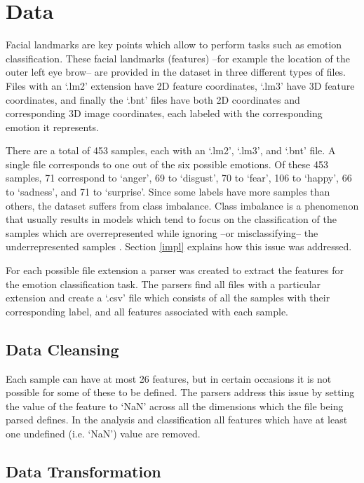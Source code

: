 \section{Data}

Facial landmarks are key points which allow to perform tasks such as emotion classification. These facial landmarks (features) --for example the location of the outer left eye brow-- are provided in the dataset in three different types of files. Files with an `.lm2' extension have 2D feature coordinates, `.lm3' have 3D feature coordinates, and finally the `.bnt' files have both 2D coordinates and corresponding 3D image coordinates, each labeled with the corresponding emotion it represents.

There are a total of 453 samples, each with an `.lm2', `.lm3', and `.bnt' file. A single file corresponds to one out of the six possible emotions. Of these 453 samples, 71 correspond to `anger', 69 to `disgust', 70 to `fear', 106 to `happy', 66 to `sadness', and 71 to `surprise'. Since some labels have more samples than others, the dataset suffers from class imbalance. Class imbalance is a phenomenon that usually results in models which tend to focus on the classification of the samples which are overrepresented while ignoring --or misclassifying-- the underrepresented samples \cite{data-mining-intro}. Section \ref{impl} explains how this issue was addressed.

For each possible file extension a parser was created to extract the features for the emotion classification task. The parsers find all files with a particular extension and create a `.csv' file which consists of all the samples with their corresponding label, and all features associated with each sample.

\subsection{Data Cleansing}

Each sample can have at most 26 features, but in certain occasions it is not possible for some of these to be defined. The parsers address this issue by setting the value of the feature to `NaN' across all the dimensions which the file being parsed defines. In the analysis and classification all features which have at least one undefined (i.e. `NaN') value are removed.

\subsection{Data Transformation}

